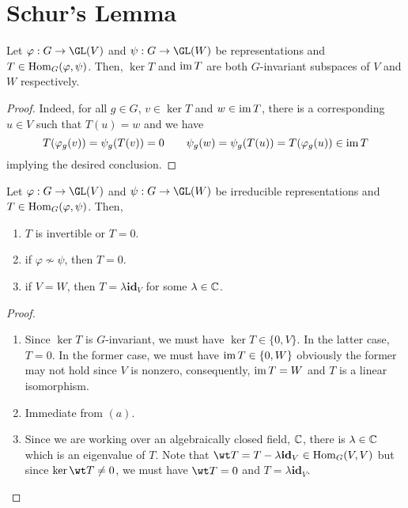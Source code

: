 \section{Schur's Lemma}

\begin{proposition}
    Let $\varphi: G\to\GL(V)$ and $\psi: G\to\GL(W)$ be representations and $T\in\operatorname{Hom}_G(\varphi,\psi)$. Then, $\ker T$ and $\operatorname{im} T$ are both $G$-invariant subspaces of $V$ and $W$ respectively.
\end{proposition}
\begin{proof}
    Indeed, for all $g\in G$, $v\in\ker T$ and $w\in\operatorname{im} T$, there is a corresponding $u\in V$ such that $T(u) = w$ and we have 
    \begin{equation*}
        T(\varphi_g(v)) = \psi_g(T(v)) = 0\qquad\psi_g(w) = \psi_g(T(u)) = T(\varphi_g(u))\in\operatorname{im} T
    \end{equation*}
    implying the desired conclusion.
\end{proof}

\begin{lemma}[Schur]
    Let $\varphi: G\to\GL(V)$ and $\psi: G\to\GL(W)$ be irreducible representations and $T\in\operatorname{Hom}_G(\varphi,\psi)$. Then, 
    \begin{enumerate}[label=(\alph*)]
        \item $T$ is invertible or $T = 0$.
        \item if $\varphi\not\sim\psi$, then $T = 0$.
        \item if $V = W$, then $T = \lambda\mathbf{id}_V$ for some $\lambda\in\mathbb{C}$.
    \end{enumerate}
\end{lemma}
\begin{proof}
\begin{enumerate}[label=(\alph*)]
    \item Since $\ker T$ is $G$-invariant, we must have $\ker T\in\{0,V\}$. In the latter case, $T = 0$. In the former case, we must have $\operatorname{im} T\in\{0, W\}$ obviously the former may not hold since $V$ is nonzero, consequently, $\operatorname{im} T = W$ and $T$ is a linear isomorphism.

    \item Immediate from $(a)$. 

    \item Since we are working over an algebraically closed field, $\mathbb{C}$, there is $\lambda\in\mathbb{C}$ which is an eigenvalue of $T$. Note that $\wt T = T - \lambda\mathbf{id}_V\in\Hom_G(V,V)$ but since $\ker\wt T\ne 0$, we must have $\wt T = 0$ and $T = \lambda\mathbf{id}_V$.
\end{enumerate}
\end{proof}

